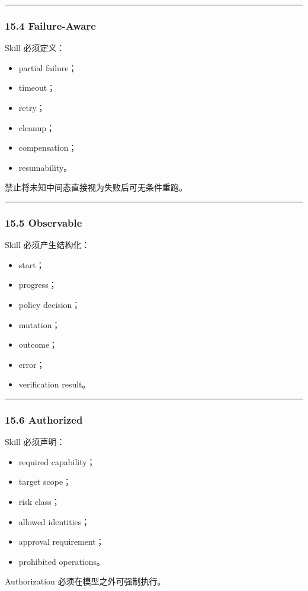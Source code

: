 \documentclass[11pt,a4paper]{article}
\begin{document}
\vspace{0.5em}\hrule\vspace{0.5em}
\subsubsection{15.4 Failure-Aware}
Skill 必须定义：

\begin{itemize}
  \item partial failure；
  \item timeout；
  \item retry；
  \item cleanup；
  \item compensation；
  \item resumability。
\end{itemize}
禁止将未知中间态直接视为失败后可无条件重跑。

\vspace{0.5em}\hrule\vspace{0.5em}
\subsubsection{15.5 Observable}
Skill 必须产生结构化：

\begin{itemize}
  \item start；
  \item progress；
  \item policy decision；
  \item mutation；
  \item outcome；
  \item error；
  \item verification result。
\end{itemize}
\vspace{0.5em}\hrule\vspace{0.5em}
\subsubsection{15.6 Authorized}
Skill 必须声明：

\begin{itemize}
  \item required capability；
  \item target scope；
  \item risk class；
  \item allowed identities；
  \item approval requirement；
  \item prohibited operations。
\end{itemize}
Authorization 必须在模型之外可强制执行。
\end{document}
